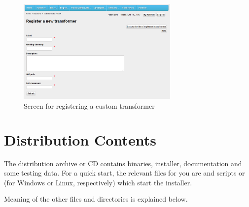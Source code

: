 \begin{figure}[hb]
    \centering
    \includegraphics[width=0.7\textwidth]{images/fe-custom-transformer.png}
    \caption{Screen for registering a custom transformer}
    \label{fig:customTransformer}
\end{figure}




\appendix

\chapter{Distribution Contents}
The distribution archive or CD contains \odcs binaries, installer, documentation and some testing data. For a quick start, the relevant files for you are  and scripts  or  (for Windows or Linux, respectively) which start the installer.

Meaning of the other files and directories is explained below.

